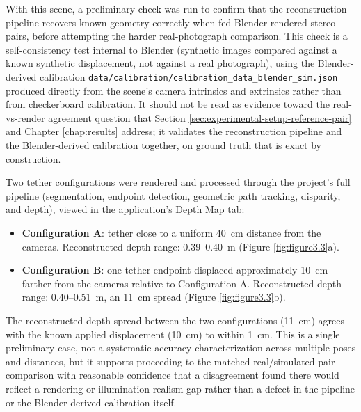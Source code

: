 \FloatBarrier

With this scene, a preliminary check was run to confirm that the reconstruction pipeline recovers known geometry correctly when fed Blender-rendered stereo pairs, before attempting the harder real-photograph comparison. This check is a self-consistency test internal to Blender (synthetic images compared against a known synthetic displacement, not against a real photograph), using the Blender-derived calibration \texttt{data/calibration/calibration\_data\_blender\_sim.json} produced directly from the scene's camera intrinsics and extrinsics rather than from checkerboard calibration. It should not be read as evidence toward the real-vs-render agreement question that Section \ref{sec:experimental-setup-reference-pair} and Chapter \ref{chap:results} address; it validates the reconstruction pipeline and the Blender-derived calibration together, on ground truth that is exact by construction.

Two tether configurations were rendered and processed through the project's full pipeline (segmentation, endpoint detection, geometric path tracking, disparity, and depth), viewed in the application's Depth Map tab:

\begin{itemize}
    \item \textbf{Configuration A}: tether close to a uniform 40~cm distance from the cameras. Reconstructed depth range: 0.39--0.40~m (Figure \ref{fig:figure3.3}a).
    \item \textbf{Configuration B}: one tether endpoint displaced approximately 10~cm farther from the cameras relative to Configuration A. Reconstructed depth range: 0.40--0.51~m, an 11~cm spread (Figure \ref{fig:figure3.3}b).
\end{itemize}

The reconstructed depth spread between the two configurations (11~cm) agrees with the known applied displacement (10~cm) to within 1~cm. This is a single preliminary case, not a systematic accuracy characterization across multiple poses and distances, but it supports proceeding to the matched real/simulated pair comparison with reasonable confidence that a disagreement found there would reflect a rendering or illumination realism gap rather than a defect in the pipeline or the Blender-derived calibration itself.

